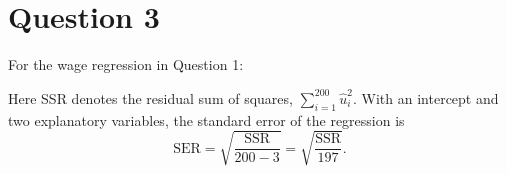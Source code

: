 \section*{Question 3}
For the wage regression in Question 1:

Here SSR denotes the residual sum of squares,
$\sum_{i=1}^{200}\hat{u}_i^2$. With an intercept and two explanatory
variables, the standard error of the regression is
\[
\mathrm{SER}=\sqrt{\frac{\mathrm{SSR}}{200-3}}
=\sqrt{\frac{\mathrm{SSR}}{197}}.
\]
